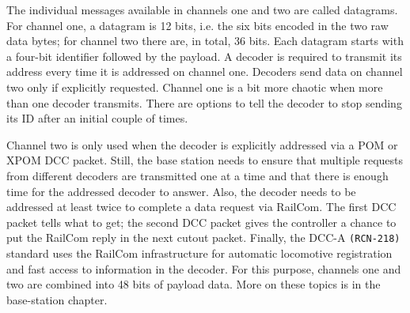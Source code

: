 \begin{center}
\end{center}

The individual messages available in channels one and two are called datagrams. For channel one, a datagram is 12 bits, i.e. the six bits encoded in the two raw data bytes; for channel two there are, in total, 36 bits. Each datagram starts with a four-bit identifier followed by the payload. A decoder is required to transmit its address every time it is addressed on channel one. Decoders send data on channel two only if explicitly requested. Channel one is a bit more chaotic when more than one decoder transmits. There are options to tell the decoder to stop sending its ID after an initial couple of times.

Channel two is only used when the decoder is explicitly addressed via a POM or XPOM DCC packet. Still, the base station needs to ensure that multiple requests from different decoders are transmitted one at a time and that there is enough time for the addressed decoder to answer. Also, the decoder needs to be addressed at least twice to complete a data request via RailCom. The first DCC packet tells what to get; the second DCC packet gives the controller a chance to put the RailCom reply in the next cutout packet. Finally, the DCC-A \texttt{(RCN-218)} standard uses the RailCom infrastructure for automatic locomotive registration and fast access to information in the decoder. For this purpose, channels one and two are combined into 48 bits of payload data. More on these topics is in the base-station chapter.

